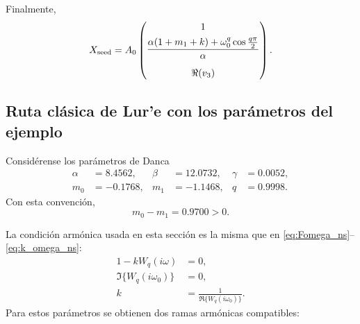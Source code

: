 \documentclass[journal]{IEEEtran}
\begin{document}
Finalmente,
\begin{equation}
\label{eq:Xseed_final_appendix}
X_{\rm seed}
=
A_0
\begin{pmatrix}
1\\[1ex]
\dfrac{
\alpha(1+m_1+k)
+
\omega_0^q\cos\frac{q\pi}{2}
}{\alpha}\\[3ex]
\Re(v_3)
\end{pmatrix}.
\end{equation}

\subsection{Ruta clásica de Lur'e con los parámetros del ejemplo}

Considérense los parámetros de Danca
\begin{equation}
\label{eq:danca_params_ns_appendix}
\begin{aligned}
\alpha&=8.4562,&
\beta&=12.0732,&
\gamma&=0.0052,\\
m_0&=-0.1768,&
m_1&=-1.1468,&
q&=0.9998.
\end{aligned}
\end{equation}
Con esta convención,
\begin{equation}
m_0-m_1=0.9700>0.
\end{equation}

La condición armónica usada en esta sección es la misma que en \eqref{eq:Fomega_ns}--\eqref{eq:k_omega_ns}:
\begin{equation}
\label{eq:harmonic_condition_appendix}
\begin{aligned}
1-k W_q(i\omega)&=0,\\
\Im\{W_q(i\omega_0)\}&=0,\\
k&=\frac{1}{\Re\{W_q(i\omega_0)\}}.
\end{aligned}
\end{equation}
Para estos parámetros se obtienen dos ramas armónicas compatibles:
\begin{table}[H]
\centering
\setlength{\tabcolsep}{3pt}
\footnotesize
{}
\caption{Ramas armónicas del Chua fraccionario no suave para los parámetros de Danca y $q=0.9998$.}
\label{tab:ramas_danca_ns}
\end{table}
\end{document}
